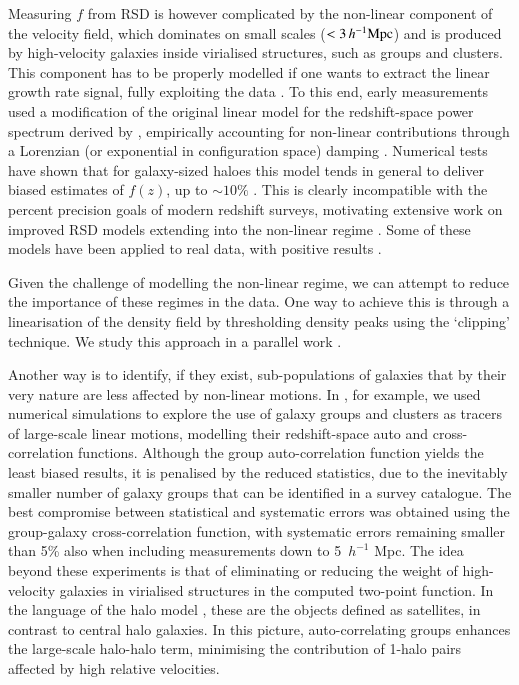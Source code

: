 \documentclass[longauth]{aa}
\def\mhmpc{\,h^{-1}{\rm Mpc}}
\newcommand{\hmpc}{$\,h^{-1}$ Mpc\xspace}
\begin{document}
Measuring $f$ from RSD is however complicated by the non-linear component of the velocity field, which dominates on small scales ($<3 \mhmpc$) and is produced by high-velocity galaxies inside virialised structures, such as groups and clusters. This component has to be properly modelled if one wants to extract the linear growth rate signal, fully exploiting the data \citep[e.g.][]{reid14}.  To this end, early measurements used a modification of the original linear model for the redshift-space power spectrum derived by \citet{kaiser87}, empirically accounting for non-linear contributions through a Lorenzian (or exponential in configuration space) damping \citep[the `dispersion model',][]{peacock94}. Numerical tests have shown that for galaxy-sized haloes this model tends in general to deliver biased estimates of $f(z)$, up to $\sim10\%$ \citep{okumura11,bianchi12}.  This is clearly incompatible with the percent precision goals of modern redshift surveys, motivating extensive work on improved RSD models extending into the non-linear regime \citep[e.g.][]{scoccimarro04,taruya10,reid11,bianchi15,bianchi16,uhlemann15}. Some of these models have been applied to real data, with positive results \citep[e.g.][and references therein]{pezzotta16,delatorre16}.

Given the challenge of modelling the non-linear regime, we can attempt to reduce the importance of these regimes in the data.  One way to achieve this is through a linearisation of the density field by thresholding density peaks using the `clipping' technique.  We study this approach in a parallel work \citep[][in preparation]{wilson17}. 

Another way is to identify, if they exist, sub-populations of galaxies that by their very nature are less affected by non-linear motions. In \cite{mohammad16}, for example, we used numerical simulations to explore the use of galaxy groups and clusters as tracers of large-scale linear motions, modelling their redshift-space auto and cross-correlation functions. Although the group auto-correlation function yields the least biased results, it is penalised by the reduced statistics, due to the inevitably smaller number of galaxy groups that can be identified in a survey catalogue. The best compromise between statistical and systematic errors was obtained using the group-galaxy cross-correlation function, with systematic errors remaining smaller than 5\% also when including measurements down to 5 \hmpc.  The idea beyond these experiments is that of eliminating or reducing the weight of high-velocity galaxies in virialised structures in the computed two-point function. In the language of the halo model \citep{cooray02}, these are the objects defined as satellites, in contrast to central halo galaxies. In this picture, auto-correlating groups enhances the large-scale halo-halo term, minimising the contribution of 1-halo pairs affected by high relative velocities. 
\end{document}

